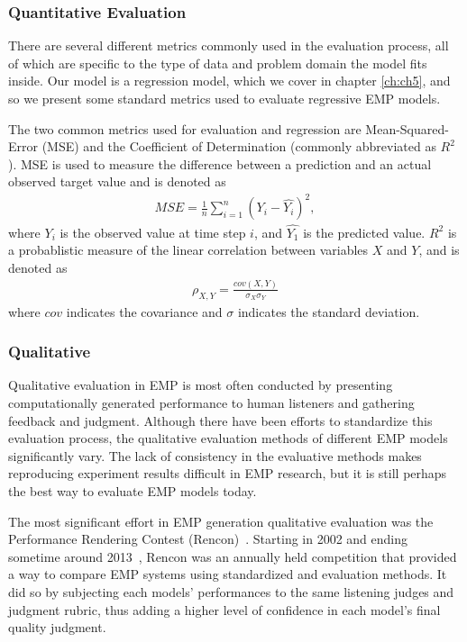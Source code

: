 \subsubsection{Quantitative Evaluation}
There are several different metrics commonly used in the evaluation process, all of which are specific to the type of data and problem domain the model fits inside. Our model is a regression model, which we cover in chapter \ref{ch:ch5}, and so we present some standard metrics used to evaluate regressive EMP models. 

The two common metrics used for evaluation and regression are Mean-Squared-Error (MSE) and the Coefficient of Determination (commonly abbreviated as $R^2$). MSE is used to measure the difference between a prediction and an actual observed target value and is denoted as 
\begin{align*}
MSE = \frac{1}{n}\sum_{i=1}^{n}(Y_i - \hat{Y_i})^2,
\end{align*}
where $Y_i$ is the observed value at time step $i$, and $\hat{Y_1}$ is the predicted value. $R^2$ is a probablistic measure of the linear correlation between variables $X$ and $Y$, and is denoted as 
\begin{align*}
\rho_{X,Y} = \frac{cov(X,Y)}{\sigma_{X}\sigma_{Y}}   
\end{align*}
where $cov$ indicates the covariance and $\sigma$ indicates the standard deviation.

\subsubsection{Qualitative}
Qualitative evaluation in EMP is most often conducted by presenting computationally generated performance to human listeners and gathering feedback and judgment. Although there have been efforts to standardize this evaluation process, the qualitative evaluation methods of different EMP models significantly vary. The lack of consistency in the evaluative methods makes reproducing experiment results difficult in EMP research, but it is still perhaps the best way to evaluate EMP models today. 

The most significant effort in EMP generation qualitative evaluation was the Performance Rendering Contest (Rencon)~\cite{katayose2012evaluating}. Starting in 2002 and ending sometime around 2013~\cite{cancino2018computational}, Rencon was an annually held competition that provided a way to compare EMP systems using standardized and evaluation methods. It did so by subjecting each models' performances to the same listening judges and judgment rubric, thus adding a higher level of confidence in each model's final quality judgment. 


